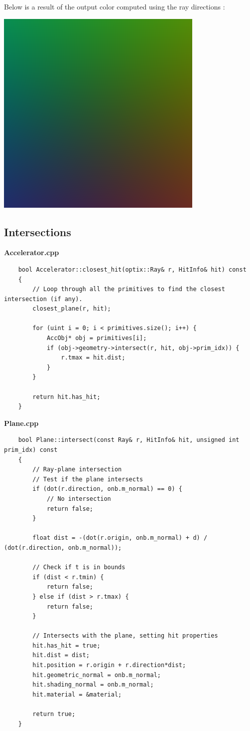 \documentclass[a4,12pt]{article}
\begin{document}
	Below is a result of the output color computed using the ray directions :
	\begin{center}
		\includegraphics[width =10cm]{./Worksheet1/ray_colors.png}
	\end{center}
	
	\subsection{Intersections}
	\textbf{Accelerator.cpp}
	\begin{lstlisting}
	bool Accelerator::closest_hit(optix::Ray& r, HitInfo& hit) const
	{
		// Loop through all the primitives to find the closest intersection (if any).
		closest_plane(r, hit);
		
		for (uint i = 0; i < primitives.size(); i++) {
			AccObj* obj = primitives[i];
			if (obj->geometry->intersect(r, hit, obj->prim_idx)) {
				r.tmax = hit.dist;
			}
		}
		
		return hit.has_hit;
	}
	\end{lstlisting}
	
	\textbf{Plane.cpp}
	\begin{lstlisting}
	bool Plane::intersect(const Ray& r, HitInfo& hit, unsigned int prim_idx) const
	{
		// Ray-plane intersection
		// Test if the plane intersects
		if (dot(r.direction, onb.m_normal) == 0) {
			// No intersection
			return false;
		}
		
		float dist = -(dot(r.origin, onb.m_normal) + d) / (dot(r.direction, onb.m_normal));
		
		// Check if t is in bounds
		if (dist < r.tmin) {
			return false;
		} else if (dist > r.tmax) {
			return false;
		}
	
		// Intersects with the plane, setting hit properties
		hit.has_hit = true;
		hit.dist = dist;
		hit.position = r.origin + r.direction*dist;
		hit.geometric_normal = onb.m_normal;
		hit.shading_normal = onb.m_normal;
		hit.material = &material;
		
		return true;
	}
	\end{lstlisting}
	
\end{document}

